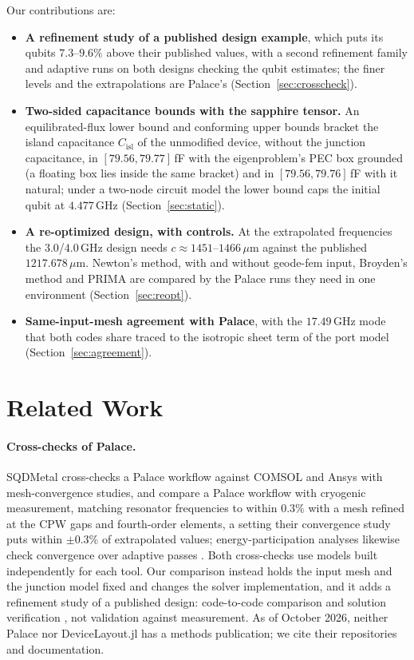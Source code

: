\documentclass{anvil-paper}
\newcommand{\Cisl}{C_{\mathrm{isl}}}
\begin{document}
Our contributions are:
\begin{itemize}
  \item \textbf{A refinement study of a published design example}, which
    puts its qubits $7.3$--$9.6\%$ above their published values, with a
    second refinement family and adaptive runs on both designs checking
    the qubit estimates; the finer levels and the extrapolations are
    Palace's (Section~\ref{sec:crosscheck}).
  \item \textbf{Two-sided capacitance bounds with the sapphire tensor.}
    An equilibrated-flux lower bound and conforming upper bounds bracket
    the island capacitance $\Cisl$ of the unmodified device, without the
    junction capacitance, in $[79.56, 79.77]$\,fF with the eigenproblem's PEC box
    grounded (a floating box lies inside the same bracket) and in
    $[79.56, 79.76]$\,fF with it natural; under a two-node circuit model the lower bound caps the
    initial qubit at $4.477$\,GHz (Section~\ref{sec:static}).
  \item \textbf{A re-optimized design, with controls.} At the extrapolated
    frequencies the $3.0$/$4.0$\,GHz design needs $c \approx
    1451$--$1466\,\mu$m against the published $1217.678\,\mu$m. Newton's
    method, with and without geode-fem input, Broyden's method and PRIMA
    are compared by the Palace runs they need in one environment
    (Section~\ref{sec:reopt}).
  \item \textbf{Same-input-mesh agreement with Palace}, with the
    $17.49$\,GHz mode that both codes share traced to the isotropic sheet
    term of the port model (Section~\ref{sec:agreement}).
\end{itemize}

\section{Related Work}
\label{sec:related}

\paragraph{Cross-checks of Palace.}
SQDMetal \citep{sommers2025open} cross-checks a Palace workflow against
COMSOL and Ansys with mesh-convergence studies, and
\citet{ye2025electromagnetic} compare a Palace workflow with cryogenic
measurement, matching resonator frequencies to within $0.3\%$ with a mesh
refined at the CPW gaps and fourth-order elements, a setting their
convergence study puts within $\pm0.3\%$ of extrapolated values;
energy-participation analyses likewise check convergence over adaptive
passes \citep{minev2021energy}. Both cross-checks use models built
independently for each tool. Our comparison instead holds the input mesh
and the junction model fixed and changes the solver implementation, and it
adds a refinement study of a published design: code-to-code comparison and
solution verification \citep{oberkampf2010verification}, not validation
against measurement. As of October 2026, neither Palace nor DeviceLayout.jl has a
methods publication; we cite their repositories and documentation.
\end{document}
